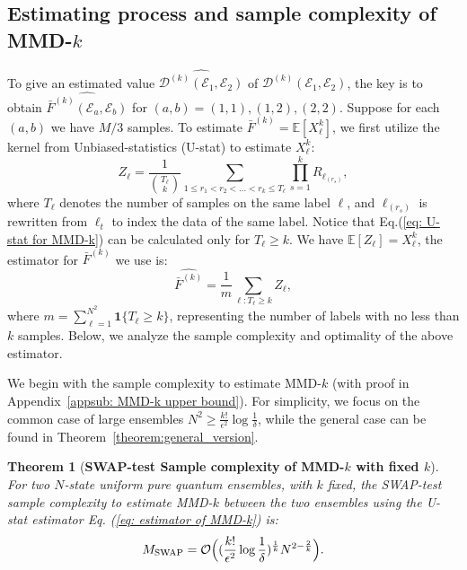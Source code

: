 \documentclass[aps,prx,reprint,superscriptaddress,amsmath,amssymb,longbibliography,floatfix]{revtex4-2}
\newcommand{\dsE}{\mathbb{E}}
\newcommand{\scD}{\mathcal{D}}
\newcommand{\scE}{\mathcal{E}}
\newcommand{\scO}{\mathcal{O}}
\theoremstyle{plain}
\newtheorem{theorem}{Theorem}[section]
\theoremstyle{definition}
\theoremstyle{remark}
\begin{document}
\subsection{Estimating process and sample complexity of MMD-$k$}
To give an estimated value $\widehat{\scD^{(k)}(\scE_1,\scE_2)}$ of $\scD^{(k)}(\scE_1,\scE_2)$, the key is to obtain $\widehat{\bar{F}^{(k)}(\scE_a, \scE_b)}$ for $(a,b)=(1,1),(1,2),(2,2)$. Suppose for each $(a,b)$ we have $M/3$ samples. To estimate $\bar{F}^{(k)}=\dsE[X^k_{\ell}]$, we first utilize the kernel from Unbiased-statistics (U-stat) \cite{U-stat_10.1214/aoms/1177730196} to estimate $X_{\ell}^k$:
\begin{equation}
    Z_{\ell} = \frac{1}{\binom{T_{\ell}}{k}}\sum_{1\le r_1 <r_2<...<r_k \le T_{\ell}} \prod_{s=1}^k R_{\ell_{(r_s)}}, \label{eq: U-stat for MMD-k}
\end{equation}
where $T_{\ell}$ denotes the number of samples on the same label $\ell$, and $\ell_{(r_s)}$ is rewritten from $\ell_t$ to index the data of the same label. Notice that Eq.(\ref{eq: U-stat for MMD-k}) can be calculated only for $T_{\ell} \ge k$. We have $\dsE[Z_{\ell}]=X_{\ell}^k$, the estimator for $\bar{F}^{(k)}$ we use is:
\begin{equation}
    \widehat{\bar{F}^{(k)}}=\frac{1}{m}\sum_{\ell:T_{\ell}\ge k}Z_{\ell},\label{eq: estimator of MMD-k}
\end{equation}
where $m=\sum_{\ell=1}^{N^2} \mathbf{1}\{T_{\ell} \ge k\}$, representing the number of labels with no less than $k$ samples. Below, we analyze the sample complexity and optimality of the above estimator.

We begin with the sample complexity to estimate MMD-$k$ (with proof in Appendix~\ref{appsub: MMD-k upper bound}). For simplicity, we focus on the common case of large ensembles $N^2 \ge \frac{k!}{\epsilon^2}\log\frac{1}{\delta}$, while the general case can be found in Theorem~\ref{theorem:general_version}.

\begin{theorem}[\textbf{SWAP-test Sample complexity of MMD-$k$ with fixed $k$}]
    For two $N$-state uniform pure quantum ensembles, with $k$ fixed, the SWAP-test sample complexity to estimate MMD-$k$ between the two ensembles using the U-stat estimator Eq. (\ref{eq: estimator of MMD-k}) is:
    \begin{equation}
        M_{\rm SWAP} = \scO\Big((\frac{k!}{\epsilon^2}\log \frac{1}{\delta})^{\frac{1}{k}}N^{2-\frac{2}{k}}\Big). \label{eq: sample complexity of MMD-k, upper bound for most case}
    \end{equation}\label{thm: sample complexity of MMD-k, upper bound, most general case}
\end{theorem}
\end{document}
